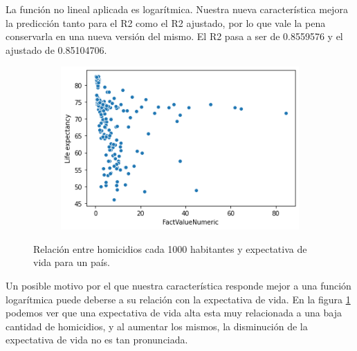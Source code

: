 La función no lineal aplicada es logarítmica. Nuestra nueva característica mejora la predicción tanto para el R2 como el R2 ajustado, por lo que vale la pena conservarla en una nueva versión del mismo. El R2 pasa a ser de 0.8559576 y el ajustado de 0.85104706.

\begin{figure}[H]
              \centering
              \begin{subfigure}{0.5\linewidth}
                \centering
                \includegraphics[width=\textwidth]{img/homicide_life_expectancy.png}
              \end{subfigure}
               \caption{Relación entre homicidios cada 1000 habitantes y expectativa de vida para un país.}
               \label{fig:life_expectancy_homicides}
        \end{figure}

Un posible motivo por el que nuestra característica responde mejor a una función logarítmica puede deberse a su relación con la expectativa de vida. En la figura \ref{fig:life_expectancy_homicides} podemos ver que  una expectativa de vida alta esta muy relacionada a una baja cantidad de homicidios, y al aumentar los mismos, la disminución de la expectativa de vida no es tan pronunciada.